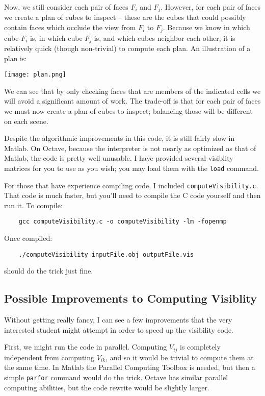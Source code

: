 \documentclass{article}
\begin{document}
Now, we still consider each pair of faces $F_i$ and $F_j$.  However, for each pair of faces we create a plan of cubes to inspect -- these are the cubes that could possibly contain faces which occlude the view from $F_i$ to $F_j$. Because we know in which cube $F_i$ is, in which cube $F_j$ is, and which cubes neighbor each other, it is relatively quick (though non-trivial) to compute each plan.  An illustration of a plan is: 
\begin{center}
    \texttt{[image: plan.png]}
\end{center}
We can see that by only checking faces that are members of the indicated cells we will avoid a significant amount of work.   The trade-off is that for each pair of faces we must now create a plan of cubes to inspect; balancing those will be different on each scene.  

Despite the algorithmic improvements in this code, it is still fairly slow in Matlab.  On Octave, because the interpreter is not nearly as optimized as that of Matlab, the code is pretty well unusable.  I have provided several visiblity matrices for you to use as you wish; you may load them with the \texttt{load} command.  

For those that have experience compiling code, I included \texttt{computeVisibility.c}.  That code is much faster, but you'll need to compile the C code yourself and then run it.  To compile:
\begin{verbatim}
    gcc computeVisibility.c -o computeVisibility -lm -fopenmp
\end{verbatim}
Once compiled:
\begin{verbatim}
    ./computeVisibility inputFile.obj outputFile.vis
\end{verbatim}
should do the trick just fine. 

\subsection*{Possible Improvements to Computing Visiblity}
Without getting really fancy, I can see a few improvements that the very interested student might attempt in order to speed up the visibility code. 

First, we might run the code in parallel.  Computing $V_{ij}$ is completely independent from computing $V_{ik}$, and so it would be trivial to compute them at the same time. In Matlab the Parallel Computing Toolbox is needed, but then a simple \texttt{parfor} command would do the trick.  Octave has similar parallel computing abilities, but the code rewrite would be slightly larger. 
\end{document}

